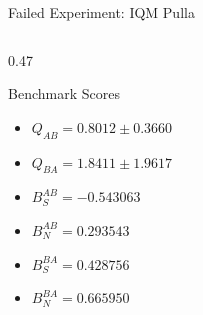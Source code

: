 \documentclass{beamer}
\begin{document}
\begin{frame}{Failed Experiment: IQM Pulla}
\begin{columns}
\begin{column}{0.47\textwidth}
				\begin{block}{Benchmark Scores}
					
					\begin{itemize}

						\item $Q_{AB} = 0.8012 \pm 0.3660$
												
						\item $Q_{BA} = 1.8411 \pm 1.9617$
						
						\item $B_S^{AB} = -0.543063$
					
						\item $B_N^{AB} = 0.293543$
					
						\item $B_S^{BA} = 0.428756$
					
						\item $B_N^{BA} = 0.665950$
						
					\end{itemize}
				\end{block}
				
			\end{column}
			
		\end{columns}

	\end{frame}
\end{document}
